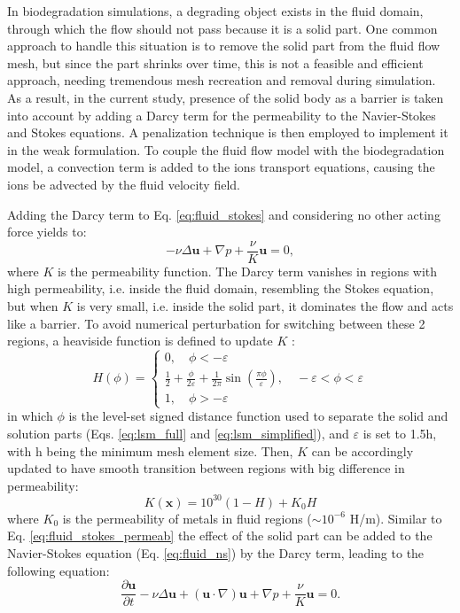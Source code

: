 In biodegradation simulations, a degrading object exists in the fluid domain, through which the flow should not pass because it is a solid part. One common approach to handle this situation is to remove the solid part from the fluid flow mesh, but since the part shrinks over time, this is not a feasible and efficient approach, needing tremendous mesh recreation and removal during simulation. As a result, in the current study, presence of the solid body as a barrier is taken into account by adding a Darcy term for the permeability to the Navier-Stokes and Stokes equations. A penalization technique is then employed to implement it in the weak formulation. To couple the fluid flow model with the biodegradation model, a convection term is added to the ions transport equations, causing the ions be advected by the fluid velocity field.

Adding the Darcy  term to Eq. \ref{eq:fluid_stokes} and considering no other acting force yields to:
\begin{equation} \label{eq:fluid_stokes_permeab}
- \nu\Delta \mathbf{u} + \nabla p + \frac{\nu}{K} \mathbf{u} = 0,
\end{equation}
where $K$ is the permeability function. The Darcy term vanishes in regions with high permeability, i.e. inside the fluid domain, resembling the Stokes equation, but when $K$ is very small, i.e. inside the solid part, it dominates the flow and acts like a barrier. To avoid numerical perturbation for switching between these 2 regions, a heaviside function is defined to update $K$ \cite{Guyot2016}:
\begin{equation}
H(\phi)=\left\{\begin{array}{l}
0, \quad \phi<-\varepsilon \\
\frac{1}{2}+\frac{\phi}{2 \varepsilon}+\frac{1}{2 \pi} \sin \left(\frac{\pi \phi}{\varepsilon}\right), \quad-\varepsilon<\phi<\varepsilon \\
1, \quad \phi>-\varepsilon
\end{array}\right.
\end{equation}
in which $\phi$ is the level-set signed distance function used to separate the solid and solution parts (Eqs. \ref{eq:lsm_full} and \ref{eq:lsm_simplified}), and $\varepsilon$ is set to 1.5h, with h being the minimum mesh element size. Then, $K$ can be accordingly updated to have smooth transition between regions with big difference in permeability:
\begin{equation}
K(\boldsymbol{x})=10^{30}(1-H)+K_{0} H
\end{equation}
where $K_{0}$ is the permeability of metals in fluid regions ($\sim10^{-6}$ H/m). Similar to Eq. \ref{eq:fluid_stokes_permeab} the effect of the solid part can be added to the Navier-Stokes equation (Eq. \ref{eq:fluid_ns}) by the Darcy term, leading to the following equation: 
\begin{equation}  \label{eq:fluid_ns_permeab}
\frac{{\partial {\mathbf{u}}}}{{\partial t}} - \nu\Delta{\mathbf{u}} + \left( {{\mathbf{u}} \cdot \nabla } \right) {\mathbf{u}} + \nabla p + \frac{\nu}{K} \mathbf{u} = 0.
\end{equation}

